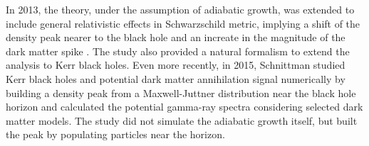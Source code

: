 \documentclass[a4paper,10pt]{article}
\begin{document}
% 




In 2013, the theory, under the assumption of adiabatic growth, 
was extended to include general relativistic effects in Schwarzschild metric, 
implying a shift of the density peak nearer to the black hole  
and an increate in the magnitude of the dark matter spike 
\citep{Sadeghian_Ferrer_Will_2013}. The study
also provided a natural formalism to extend the analysis to 
Kerr black holes. Even more recently, in 2015, Schnittman 
studied Kerr black holes and potential dark matter annihilation signal 
numerically by building a density peak from a Maxwell-Juttner 
distribution near the black hole horizon and calculated 
the potential gamma-ray spectra considering selected 
dark matter models. The study did not simulate the adiabatic 
growth itself, but built the peak by populating particles 
near the horizon.


\end{document}
